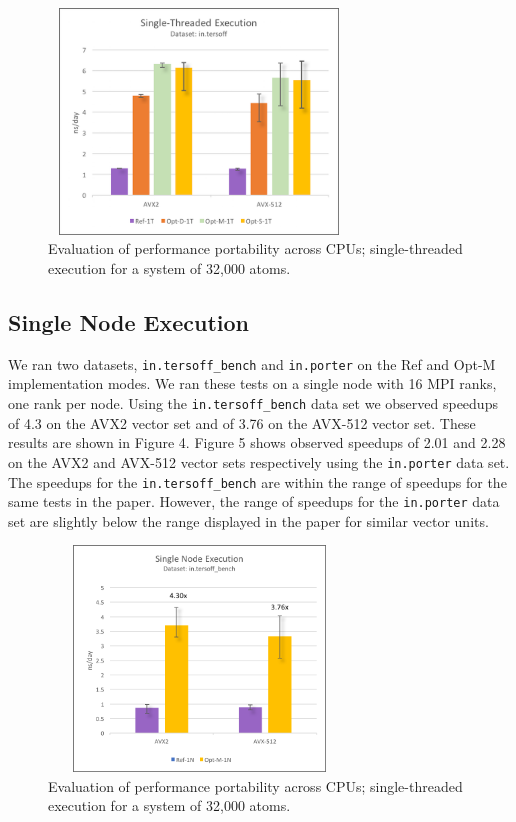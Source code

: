 \documentclass{sig-alternate-05-2015}
\begin{document}
\begin{figure}
\centering
\includegraphics[height=6cm, width=8cm]{SingleThread.png}
\caption{Evaluation of performance portability across CPUs; single-threaded execution for a system of 32,000 atoms.}
\vskip -6pt
\end{figure}

\subsection{Single Node Execution}
We ran two datasets, \texttt{in.tersoff\_bench} and \texttt{in.porter} on the Ref and Opt-M implementation modes.  We ran these tests on a single node with 16 MPI ranks, one rank per node.  Using the \texttt{in.tersoff\_bench} data set we observed speedups of 4.3 on the AVX2 vector set and of 3.76 on the AVX-512 vector set.  These results are shown in Figure 4.  Figure 5 shows observed speedups of 2.01 and 2.28 on the AVX2 and AVX-512 vector sets respectively using the \texttt{in.porter} data set.  The speedups for the \texttt{in.tersoff\_bench} are within the range of speedups for the same tests in the paper.  However, the range of speedups for the \texttt{in.porter} data set are slightly below the range displayed in the paper for similar vector units.

\begin{figure}
\centering
\includegraphics[height=6cm, width=8cm]{SingleNodeBench.png}
\caption{Evaluation of performance portability across CPUs; single-threaded execution for a system of 32,000 atoms.}
\vskip -6pt
\end{figure}
\end{document}
